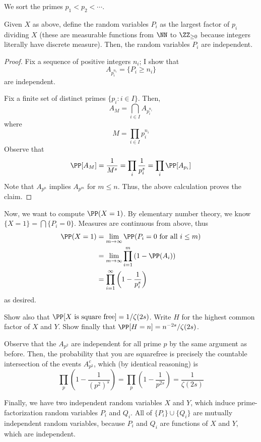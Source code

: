 \documentclass[11pt, headheight=30pt]{scrartcl}
\begin{document}
We sort the primes $p_1 < p_2 < \cdots$.

\begin{claim*}
    Given $X$ as above, define the random variables
    $P_i$ as the largest factor of $p_i$ dividing $X$
    (these are measurable functions from $\NN$ to $\ZZ_{\geq 0}$
    because integers literally have discrete measure).
    Then, the random variables $P_i$ are independent.
\end{claim*}
\begin{proof} 
Fix a sequence of positive integers $n_i$; I show that
\[
    A_{p_i^{n_i}} = \{P_i \geq n_i\}
\]
are independent.

Fix a finite set of distinct primes $\{p_i: i\in I\}$. Then,
\[
    A_M = \bigcap_{i\in I} A_{p_i^{n_i}}
\]
where
\[
    M = \prod_{i\in I} p_i^{n_i}    
\]
Observe that
\[
    \PP[A_M] = \frac{1}{M^s} = \prod_i \frac{1}{p_i^s} = \prod_i \PP[A_{p_i}]    
\]
Note that $A_{p^n}$ implies $A_{p^m}$ for $m\leq n$. Thus, the above calculation
proves the claim.
\end{proof}

Now, we want to compute $\PP(X = 1)$. By elementary number theory,
we know $\{X = 1\} = \bigcap \{P_i = 0\}$.
Measures are continuous from above, thus
\begin{align*}
    \PP(X = 1) &= \lim_{m\to\infty} \PP(P_i = 0 \text{ for all } i\leq m)\\
    &= \lim_{m\to \infty} \prod_{i=1}^m \left(1 - \PP(A_i)\right)\\
    &= \prod_{i=1}^\infty \left(1 - \frac{1}{p_i^s}\right)
\end{align*}
as desired.

\begin{prob}
    Show also that $\PP[X \text{ is square free}] = 1/\zeta(2s)$.
    Write $H$ for the highest common factor of $X$ and
    $Y$. Show finally that $\PP[H = n] = n^{-2s}/\zeta(2s)$.
\end{prob}
Observe that the $A_{p^2}$ are independent
for all prime $p$ by the same argument as before. Then, the probability
that you are squarefree is precisely the countable intersection of the events
$A_{p^2}^c$, which (by identical reasoning) is
\[
    \prod_p \left(1 - \frac{1}{(p^2)^s}\right) = \prod_p \left(1 - \frac{1}{p^{2s}}\right) = \frac{1}{\zeta(2s)}    
\]

Finally, we have two independent random variables $X$ and $Y$,
which induce prime-factorization random variables $P_i$ and $Q_i$.
All of $\{P_i\}\cup \{Q_i\}$ are mutually independent random variables,
because $P_i$ and $Q_i$ are functions of $X$ and $Y$, which are independent.
\end{document}
